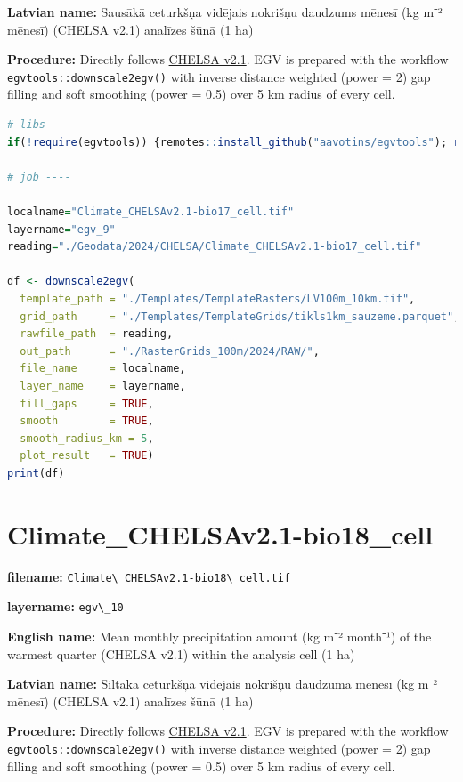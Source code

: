 \documentclass[
]{book}
\newcommand{\passthrough}[1]{#1}
\begin{document}
\textbf{Latvian name:} Sausākā ceturkšņa vidējais nokrišņu daudzums mēnesī (kg m⁻² mēnesī) (CHELSA v2.1) analīzes šūnā (1 ha)

\textbf{Procedure:} Directly follows \hyperref[Ch04.11]{CHELSA v2.1}. EGV is prepared with the
workflow \passthrough{\lstinline!egvtools::downscale2egv()!} with inverse distance weighted (power = 2)
gap filling and soft smoothing (power = 0.5) over 5 km radius of every cell.

\begin{lstlisting}[language=R]
# libs ----
if(!require(egvtools)) {remotes::install_github("aavotins/egvtools"); require(egvtools)}

# job ----

localname="Climate_CHELSAv2.1-bio17_cell.tif"
layername="egv_9"
reading="./Geodata/2024/CHELSA/Climate_CHELSAv2.1-bio17_cell.tif"

df <- downscale2egv(
  template_path = "./Templates/TemplateRasters/LV100m_10km.tif",
  grid_path     = "./Templates/TemplateGrids/tikls1km_sauzeme.parquet",
  rawfile_path  = reading,
  out_path      = "./RasterGrids_100m/2024/RAW/",
  file_name     = localname,
  layer_name    = layername,
  fill_gaps     = TRUE,
  smooth        = TRUE,
  smooth_radius_km = 5,
  plot_result   = TRUE)
print(df)
\end{lstlisting}

\section{Climate\_CHELSAv2.1-bio18\_cell}\label{ch06.010}

\textbf{filename:} \passthrough{\lstinline!Climate\_CHELSAv2.1-bio18\_cell.tif!}

\textbf{layername:} \passthrough{\lstinline!egv\_10!}

\textbf{English name:} Mean monthly precipitation amount (kg m⁻² month⁻¹) of the warmest quarter (CHELSA v2.1) within the analysis cell (1 ha)

\textbf{Latvian name:} Siltākā ceturkšņa vidējais nokrišņu daudzuma mēnesī (kg m⁻² mēnesī) (CHELSA v2.1) analīzes šūnā (1 ha)

\textbf{Procedure:} Directly follows \hyperref[Ch04.11]{CHELSA v2.1}. EGV is prepared with the
workflow \passthrough{\lstinline!egvtools::downscale2egv()!} with inverse distance weighted (power = 2)
gap filling and soft smoothing (power = 0.5) over 5 km radius of every cell.
\end{document}
